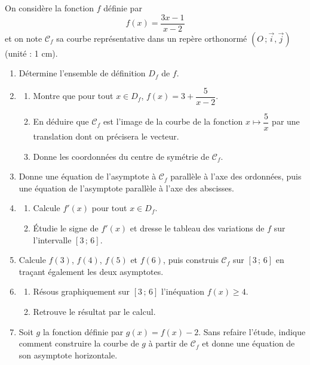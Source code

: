 \documentclass[11pt]{article}
\begin{document}
\begin{exercice}
On considère la fonction $f$ définie par
\[ f(x)=\dfrac{3x-1}{x-2} \]
et on note $\mathcal{C}_{f}$ sa courbe représentative dans un repère orthonormé $(O\,;\vec{i},\vec{j})$ (unité : 1 cm).
\begin{enumerate}
\item Détermine l'ensemble de définition $D_{f}$ de $f$.
\item \begin{enumerate}
\item Montre que pour tout $x\in D_{f}$, $f(x)=3+\dfrac{5}{x-2}$.
\item En déduire que $\mathcal{C}_{f}$ est l'image de la courbe de la fonction $x\mapsto\dfrac{5}{x}$ par une translation dont on précisera le vecteur.
\item Donne les coordonnées du centre de symétrie de $\mathcal{C}_{f}$.
\end{enumerate}
\item Donne une équation de l'asymptote à $\mathcal{C}_{f}$ parallèle à l'axe des ordonnées, puis une équation de l'asymptote parallèle à l'axe des abscisses.
\item \begin{enumerate}
\item Calcule $f'(x)$ pour tout $x\in D_{f}$.
\item Étudie le signe de $f'(x)$ et dresse le tableau des variations de $f$ sur l'intervalle $[3\,;\,6]$.
\end{enumerate}
\item Calcule $f(3)$, $f(4)$, $f(5)$ et $f(6)$, puis construis $\mathcal{C}_{f}$ sur $[3\,;\,6]$ en traçant également les deux asymptotes.
\item \begin{enumerate}
\item Résous graphiquement sur $[3\,;\,6]$ l'inéquation $f(x)\geq 4$.
\item Retrouve le résultat par le calcul.
\end{enumerate}
\item Soit $g$ la fonction définie par $g(x)=f(x)-2$. Sans refaire l'étude, indique comment construire la courbe de $g$ à partir de $\mathcal{C}_{f}$ et donne une équation de son asymptote horizontale.
\end{enumerate}
\end{exercice}
\end{document}
